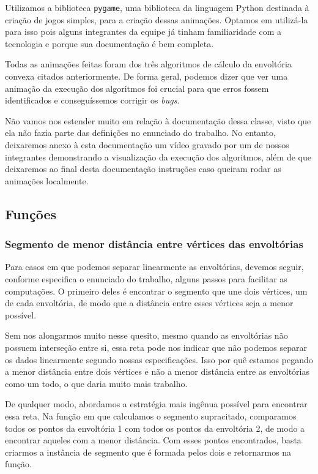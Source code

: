 \documentclass{article}
\begin{document}
Utilizamos a biblioteca \texttt{pygame}, uma biblioteca da linguagem Python destinada à criação de jogos simples, para a criação dessas animações. Optamos em utilizá-la para isso pois alguns integrantes da equipe já tinham familiaridade com a tecnologia e porque sua documentação é bem completa.

Todas as animações feitas foram dos três algoritmos de cálculo da envoltória convexa citados anteriormente. De forma geral, podemos dizer que ver uma animação da execução dos algoritmos foi crucial para que erros fossem identificados e conseguíssemos corrigir os \textit{bugs}.

Não vamos nos estender muito em relação à documentação dessa classe, visto que ela não fazia parte das definições no enunciado do trabalho. No entanto, deixaremos anexo à esta documentação um vídeo gravado por um de nossos integrantes demonstrando a visualização da execução dos algoritmos, além de que deixaremos ao final desta documentação instruções caso queiram rodar as animações localmente.

\subsection{Funções}

\subsubsection{Segmento de menor distância entre vértices das envoltórias}

Para casos em que podemos separar linearmente as envoltórias, devemos seguir, conforme especifica o enunciado do trabalho, alguns passos para facilitar as computações. O primeiro deles é encontrar o segmento que une dois vértices, um de cada envoltória, de modo que a distância entre esses vértices seja a menor possível.

Sem nos alongarmos muito nesse quesito, mesmo quando as envoltórias não possuem interseção entre si, essa reta pode nos indicar que não podemos separar os dados linearmente segundo nossas especificações. Isso por quê estamos pegando a menor distância entre dois vértices e não a menor distância entre as envoltórias como um todo, o que daria muito mais trabalho.

De qualquer modo, abordamos a estratégia mais ingênua possível para encontrar essa reta. Na função em que calculamos o segmento supracitado, comparamos todos os pontos da envoltória 1 com todos os pontos da envoltória 2, de modo a encontrar aqueles com a menor distância. Com esses pontos encontrados, basta criarmos a instância de segmento que é formada pelos dois e retornarmos na função.
\end{document}
